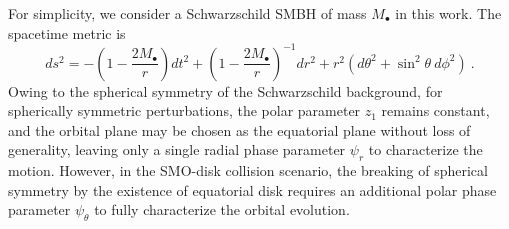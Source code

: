 \documentclass[aps,prx,reprint,superscriptaddress,nofootinbib,longbibliography]{revtex4-1}
\begin{document}
For simplicity, we consider a Schwarzschild SMBH of mass $M_{\bullet}$ in this work. The spacetime metric is
\begin{equation}
    ds^2=-\left(1-\frac{2M_{\bullet}}{r}\right)dt^2+\left(1-\frac{2M_{\bullet}}{r}\right)^{-1}dr^2+r^2\left(d\theta^2+\sin^2\theta\ d\phi^2\right) \ .
    \label{eq:Schwarzschild metric}
\end{equation}
Owing to the spherical symmetry of the Schwarzschild background, for spherically symmetric perturbations, the polar parameter $z_{1}$ remains constant, and the orbital plane may be chosen as the equatorial plane without loss of generality, leaving only a single radial phase parameter $\psi_{r}$ to characterize the motion. However, in the SMO-disk collision scenario, the breaking of spherical symmetry by the existence of equatorial disk requires an additional polar phase parameter $\psi_{\theta}$ to fully characterize the orbital evolution.\par
\end{document}
